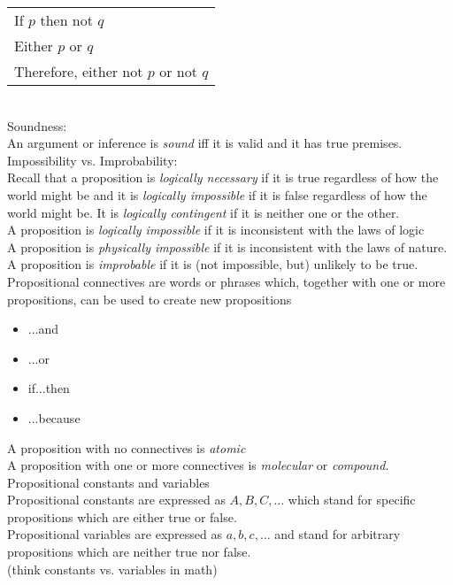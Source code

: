 \begin{tabular}{p{3cm}}
    If $p$ then not $q$\\
    Either $p$ or $q$\\
    \hline
    Therefore, either not $p$ or not $q$
\end{tabular}\\

Soundness:\\
An argument or inference is \textit{sound} iff it is valid and it has true premises.\\

Impossibility vs. Improbability:\\
Recall that a proposition is \textit{logically necessary} if it is true regardless of how the world might be and it is \textit{logically impossible} if it is false regardless of how the world might be. It is \textit{logically contingent} if it is neither one or the other.\\

A proposition is \textit{logically impossible} if it is inconsistent with the laws of logic\\
A proposition is \textit{physically impossible} if it is inconsistent with the laws of nature.\\
A proposition is \textit{improbable} if it is (not impossible, but) unlikely to be true.\\

Propositional connectives are words or phrases which, together with one or more propositions, can be used to create new propositions
\begin{itemize}
    \item ...and
    \item ...or
    \item if...then
    \item ...because
\end{itemize}
A proposition with no connectives is \textit{atomic}\\
A proposition with one or more connectives is \textit{molecular} or \textit{compound}.\\

Propositional constants and variables\\
Propositional constants are expressed as $A,B,C,\ldots$ which stand for specific propositions which are either true or false.\\
Propositional variables are expressed as $a,b,c,\ldots$ and stand for arbitrary propositions which are neither true nor false.\\
(think constants vs. variables in math)\\
